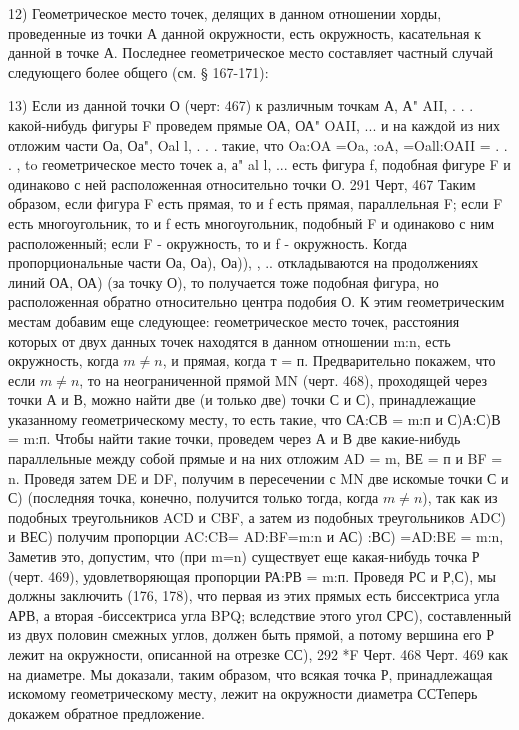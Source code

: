 12)                                   Геометрическое место точек, делящих в данном отношении хорды, проведенные из точки А данной окружности, есть окружность, касательная к данной в точке А.
Последнее геометрическое место составляет частный случай следующего более общего (см. § 167-171):

13)                                  Если из данной точки О (черт: 467) к различным точкам А, А" AII, . . . какой-нибудь фигуры F проведем прямые ОА, ОА" OAII, ... и на каждой из них отложим части Оа, Оа", Oal l, . . . такие, что Oa:OA =Oa, :oA, =Oall:OAII = . . . , to геометрическое место точек а, а" al l, ... есть фигура f, подобная фигуре F и одинаково с ней расположенная относительно точки О.
291
Черт, 467
Таким образом, если фигура F есть прямая, то и f есть прямая, параллельная F; если F есть многоугольник, то и f есть многоугольник, подобный F и одинаково с ним расположенный; если F - окружность, то и f - окружность.
Когда пропорциональные части Оа, Оа), Оа)), , .. откладываются на продолжениях линий ОА, ОА) (за точку О), то получается тоже подобная фигура, но расположенная обратно относительно центра подобия О.
К этим геометрическим местам добавим еще следующее: геометрическое место точек, расстояния которых от двух данных точек находятся в данном отношении m:n, есть окружность, когда $m\ne n$, и прямая, когда т = п.
Предварительно покажем, что если $m\ne n$, то на неограниченной прямой MN (черт. 468), проходящей через точки А и В, можно найти две (и только две) точки С и С), принадлежащие указанному геометрическому месту, то есть такие, что СА:СВ = m:п и С)А:С)В = m:п. Чтобы найти такие точки, проведем через А и В две какие-нибудь параллельные между собой прямые и на них отложим AD = m, ВЕ = п и BF = n. Проведя затем DE и DF, получим в пересечении с MN две искомые точки С и С) (последняя точка, конечно, получится только тогда, когда $m\ne n$), так как из подобных треугольников ACD и CBF, а затем из подобных треугольников ADC) и ВЕС) получим пропорции
AC:CB= AD:BF=m:n и
АС) :ВС) =AD:BE = m:n,
Заметив это, допустим, что (при m=n) существует еще какая-нибудь точка Р (черт. 469), удовлетворяющая пропорции
РА:РВ = m:п.
Проведя РС и Р,С), мы должны заключить (176, 178), что первая из этих прямых есть биссектриса угла АРВ, а вторая -биссектриса угла BPQ; вследствие этого угол СРС), составленный из двух половин смежных углов, должен быть прямой, а потому вершина его Р лежит на окружности, описанной на отрезке СС),
292
*F Черт. 468
Черт. 469
как на диаметре. Мы доказали, таким образом, что всякая точка Р, принадлежащая искомому геометрическому месту, лежит на окружности диаметра СС\. Теперь докажем обратное предложение.

